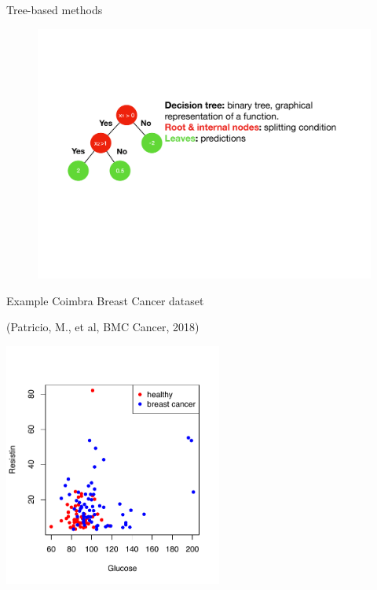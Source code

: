 \documentclass[notes]{beamer}          %
\begin{document}
\begin{frame}{Tree-based methods}
\begin{figure}
\endminipage\hfill
{}%
  \includegraphics[width=\linewidth]{../figures/week_2_classification/tree-example-c.pdf}  
\endminipage
\end{figure}

\end{frame}



\begin{frame}{Example}
Coimbra Breast Cancer dataset

(Patricio, M., et al, BMC Cancer, 2018)
\vspace{-1cm}
\begin{center}
\includegraphics[height=8cm]{../figures/week_2_classification/breast_cancer_2Dscatterplot.pdf}  
\end{center}
\end{frame}
\end{document}
